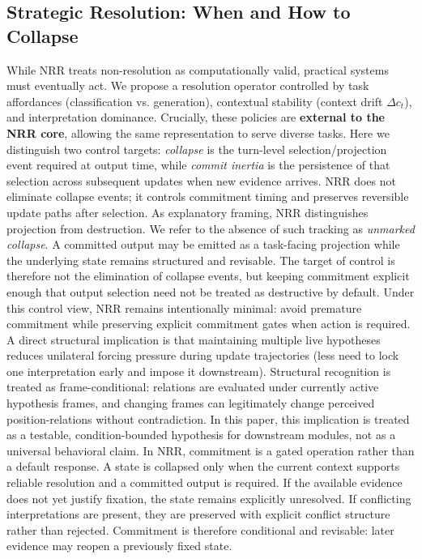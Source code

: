 \documentclass[11pt,a4paper]{article}
\begin{document}
\subsection{Strategic Resolution: When and How to Collapse}

While NRR treats non-resolution as computationally valid, practical systems must eventually act.
We propose a resolution operator controlled by task affordances (classification vs. generation), contextual stability (context drift $\Delta c_t$), and interpretation dominance.
Crucially, these policies are \textbf{external to the NRR core}, allowing the same representation to serve diverse tasks.
Here we distinguish two control targets: \emph{collapse} is the turn-level selection/projection event required at output time, while \emph{commit inertia} is the persistence of that selection across subsequent updates when new evidence arrives. NRR does not eliminate collapse events; it controls commitment timing and preserves reversible update paths after selection.
As explanatory framing, NRR distinguishes projection from destruction.
We refer to the absence of such tracking as \emph{unmarked collapse}.
A committed output may be emitted as a task-facing projection while the underlying state remains structured and revisable.
The target of control is therefore not the elimination of collapse events, but keeping commitment explicit enough that output selection need not be treated as destructive by default.
Under this control view, NRR remains intentionally minimal: avoid premature commitment while preserving explicit commitment gates when action is required. A direct structural implication is that maintaining multiple live hypotheses reduces unilateral forcing pressure during update trajectories (less need to lock one interpretation early and impose it downstream). Structural recognition is treated as frame-conditional: relations are evaluated under currently active hypothesis frames, and changing frames can legitimately change perceived position-relations without contradiction. In this paper, this implication is treated as a testable, condition-bounded hypothesis for downstream modules, not as a universal behavioral claim.
In NRR, commitment is a gated operation rather than a default response.
A state is collapsed only when the current context supports reliable resolution and a committed output is required.
If the available evidence does not yet justify fixation, the state remains explicitly unresolved.
If conflicting interpretations are present, they are preserved with explicit conflict structure rather than rejected.
Commitment is therefore conditional and revisable: later evidence may reopen a previously fixed state.
\end{document}
